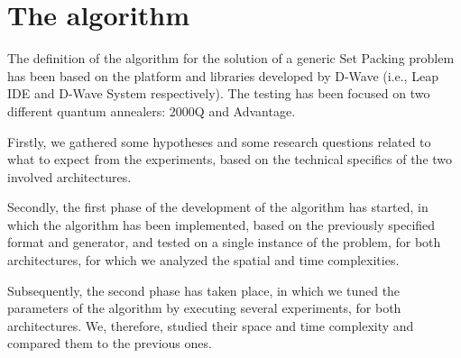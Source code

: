 \documentclass[oneside,a4paper]{article}
\begin{document}
\section{The algorithm}
The definition of the algorithm for the solution of a generic Set Packing problem has been based on the platform and libraries developed by D-Wave (i.e., Leap IDE \cite{WebSite8} and D-Wave System \cite{WebSite5} respectively). The testing has been focused on two different quantum annealers: 2000Q and Advantage.

Firstly, we gathered some hypotheses and some research questions related to what to expect from the experiments, based on the technical specifics of the two involved architectures. 

Secondly, the first phase of the development of the algorithm has started, in which the algorithm has been implemented, based on the previously specified format and generator, and tested on a single instance of the problem, for both architectures, for which we analyzed the spatial and time complexities.

Subsequently, the second phase has taken place, in which we tuned the parameters of the algorithm by executing several experiments, for both architectures. We, therefore, studied their space and time complexity and compared them to the previous ones. 
\end{document}
